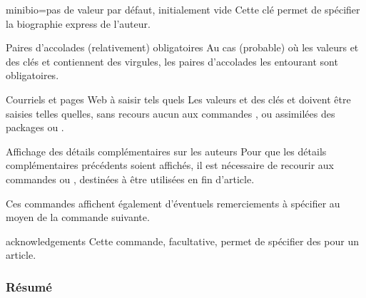 \begin{docKey}{minibio}{={}}{pas de valeur par défaut,
    initialement vide}
  Cette clé permet de spécifier la biographie express de l'auteur.
\end{docKey}

\begin{dbwarning}{Paires d'accolades
    (relativement) obligatoires}{}
  Au cas (probable) où les valeurs  et  des clés  et  contiennent des
  virgules, les paires d'accolades les entourant sont obligatoires.
\end{dbwarning}

\begin{dbwarning}{Courriels et pages Web à saisir tels quels}{}
  Les valeurs  et  des clés  et
   doivent être saisies telles quelles, sans recours aucun aux
  commandes ,  ou assimilées des packages
   ou .
\end{dbwarning}

\begin{dbremark}{Affichage des détails complémentaires sur les auteurs}{}
  Pour que les détails complémentaires précédents soient affichés, il est
  nécessaire de recourir aux commandes  ou
  , destinées à être utilisées en fin d'article.

  Ces commandes affichent également d'éventuels remerciements à spécifier au
  moyen de la commande  suivante.
\end{dbremark}

\begin{docCommand}{acknowledgements}{}
  Cette commande, facultative, permet de spécifier des  pour
  un article.
\end{docCommand}

\begin{bodycode}
\end{bodycode}

\subsubsection{Résumé}
\label{sec-resume}

